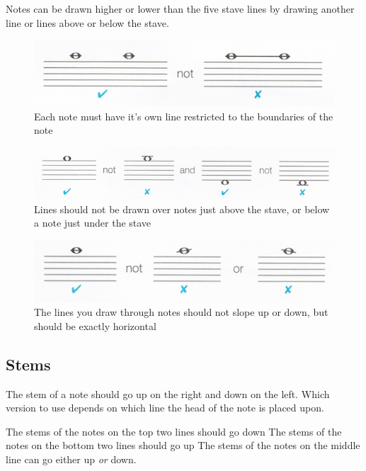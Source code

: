 Notes can be drawn higher or lower than the five stave lines by drawing another line or lines above or below the stave.

\begin{figure}[h!]
  \includegraphics[width=\linewidth]{gfx/basic/ledger-boundaries.png}
  \centering
  \caption{Each note must have it's own line restricted to the boundaries of the note}
  \label{fig:LedgerBoundaries}
\end{figure}


\begin{figure}[h!]
  \includegraphics[width=\linewidth]{gfx/basic/ledger-above.png}
  \centering
  \caption{Lines should not be drawn over notes just above the stave, or below a note just under the stave}
  \label{fig:LedgerAbove}
\end{figure}


\begin{figure}[h!]
  \includegraphics[width=\linewidth]{gfx/basic/ledger-slope.png}
  \centering
  \caption{The lines you draw through notes should not slope up or down, but should be exactly horizontal}
  \label{fig:LedgerSlope}
\end{figure}

\subsection{Stems}

The stem of a note should go up on the right and down on the left. Which version to use depends on which line the head of the note is placed upon.

The stems of the notes on the top two lines should go down
The stems of the notes on the bottom two lines should go up
The stems of the notes on the middle line can go either up \emph{or} down.

